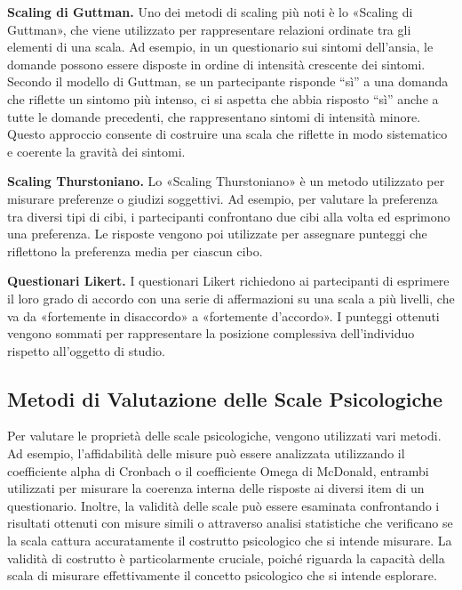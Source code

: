 \documentclass[
  letterpaper,
  DIV=11,
  numbers=noendperiod]{scrreprt}
\theoremstyle{definition}
\theoremstyle{remark}
\begin{document}
\textbf{Scaling di Guttman.} Uno dei metodi di scaling più noti è lo
«Scaling di Guttman», che viene utilizzato per rappresentare relazioni
ordinate tra gli elementi di una scala. Ad esempio, in un questionario
sui sintomi dell'ansia, le domande possono essere disposte in ordine di
intensità crescente dei sintomi. Secondo il modello di Guttman, se un
partecipante risponde ``sì'' a una domanda che riflette un sintomo più
intenso, ci si aspetta che abbia risposto ``sì'' anche a tutte le
domande precedenti, che rappresentano sintomi di intensità minore.
Questo approccio consente di costruire una scala che riflette in modo
sistematico e coerente la gravità dei sintomi.

\textbf{Scaling Thurstoniano.} Lo «Scaling Thurstoniano» è un metodo
utilizzato per misurare preferenze o giudizi soggettivi. Ad esempio, per
valutare la preferenza tra diversi tipi di cibi, i partecipanti
confrontano due cibi alla volta ed esprimono una preferenza. Le risposte
vengono poi utilizzate per assegnare punteggi che riflettono la
preferenza media per ciascun cibo.

\textbf{Questionari Likert.} I questionari Likert richiedono ai
partecipanti di esprimere il loro grado di accordo con una serie di
affermazioni su una scala a più livelli, che va da «fortemente in
disaccordo» a «fortemente d'accordo». I punteggi ottenuti vengono
sommati per rappresentare la posizione complessiva dell'individuo
rispetto all'oggetto di studio.

\subsection{Metodi di Valutazione delle Scale
Psicologiche}\label{metodi-di-valutazione-delle-scale-psicologiche}

Per valutare le proprietà delle scale psicologiche, vengono utilizzati
vari metodi. Ad esempio, l'affidabilità delle misure può essere
analizzata utilizzando il coefficiente alpha di Cronbach o il
coefficiente Omega di McDonald, entrambi utilizzati per misurare la
coerenza interna delle risposte ai diversi item di un questionario.
Inoltre, la validità delle scale può essere esaminata confrontando i
risultati ottenuti con misure simili o attraverso analisi statistiche
che verificano se la scala cattura accuratamente il costrutto
psicologico che si intende misurare. La validità di costrutto è
particolarmente cruciale, poiché riguarda la capacità della scala di
misurare effettivamente il concetto psicologico che si intende
esplorare.
\end{document}
